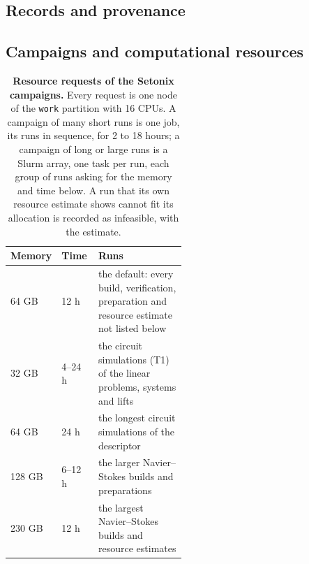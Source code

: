 \subsection{Records and provenance}
\label{app:software-records}

\subsection{Campaigns and computational resources}
\label{app:software-campaigns}

\begin{table}[htbp]
    \centering
    \caption[Resource requests of the Setonix campaigns]{\textbf{Resource requests of the Setonix campaigns.} Every request is one node of the \texttt{work} partition with 16 CPUs. A campaign of many short runs is one job, its runs in sequence, for 2 to 18 hours; a campaign of long or large runs is a Slurm array, one task per run, each group of runs asking for the memory and time below. A run that its own resource estimate shows cannot fit its allocation is recorded as infeasible, with the estimate.}
    \label{tab:resource-classes}
    \small
    \begin{tabular}{@{}l l p{0.5\linewidth}@{}}
        \toprule
        Memory & Time & Runs \\
        \midrule
        64 GB & 12 h & the default: every build, verification, preparation and resource estimate not listed below \\
        32 GB & 4--24 h & the circuit simulations (T1) of the linear problems, systems and lifts \\
        64 GB & 24 h & the longest circuit simulations of the descriptor \\
        128 GB & 6--12 h & the larger Navier--Stokes builds and preparations \\
        230 GB & 12 h & the largest Navier--Stokes builds and resource estimates \\
        \bottomrule
    \end{tabular}
\end{table}

